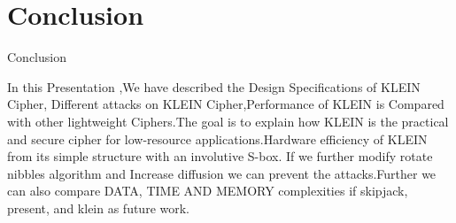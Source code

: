 \section{Conclusion}

\begin{frame}{Conclusion}

In this Presentation ,We have described the Design Specifications of KLEIN Cipher, Different attacks on KLEIN Cipher,Performance of KLEIN is Compared with other lightweight Ciphers.The goal is to explain how KLEIN is the practical and secure cipher for low-resource applications.Hardware efficiency of KLEIN from its simple structure with an involutive S-box. If we further modify rotate nibbles algorithm and Increase diffusion we can prevent the attacks.Further we can also compare DATA, TIME AND MEMORY complexities if skipjack, present, and klein as future work.

\end{frame}
        

